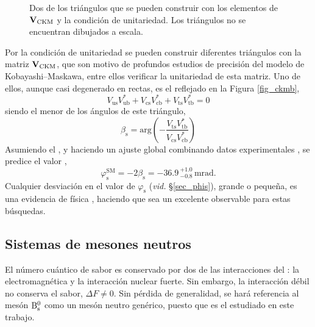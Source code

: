 \begin{figure}[H]
\centering
{} \hfill
{} \hfill
%
\caption{Dos de los triángulos que se pueden construir con los elementos de $\mathbf{V}_{\text{CKM}}$ y la condición de unitariedad. Los triángulos no se encuentran dibujados a escala.}	
\end{figure}


Por la condición de unitariedad se pueden construir diferentes triángulos con la matriz $\mathbf{V}_{\text{CKM}}$, que son motivo de profundos estudios de precisión del modelo de Kobayashi--Maskawa, entre ellos verificar la unitariedad de esta matriz. Uno de ellos, aunque casi degenerado en rectas, es el reflejado en la Figura \ref{fig_ckmb},
\begin{equation}
 V_{\mathrm{us}} V_{\mathrm{ub}}^* + V_{\mathrm{cs}} V_{\mathrm{cb}}^* + V_{\mathrm{ts}} V_{\mathrm{tb}}^* = 0 
\end{equation}
siendo el menor de los ángulos de este triángulo,
\begin{equation}
	\beta_{\mathrm{s}} =  \text{arg} \left( - \frac{V_{\mathrm{ts}} V_{\mathrm{tb}}^*}{V_{\mathrm{cs}} V_{\mathrm{cb}}^*}   \right)  \label{eq_bs_ckm}
\end{equation}
\color{vero} Asumiendo el \stdmod, y haciendo un ajuste global combinando datos experimentales \cite{ckmfitter1}, se predice el valor  , %
\begin{equation}
	\varphi_{\text{s}}^{\text{SM}} = -2 \beta_{\text{s}} = -36.9\,{}_{-0.8}^{+1.0} \, \text{mrad}. \label{eq_smpredicphis}
\end{equation} \color{norm}
\color{dieg} Cualquier desviación en el valor de $\varphi_{\text{s}}$ (\emph{vid.} \S\ref{sec_phis}), grande o pequeña, es una evidencia de física \bstdmod, haciendo que  sea un excelente observable para estas búsquedas. \color{norm}

\subsection{Sistemas de mesones neutros} %
\label{sec_neutralmesons}

El número cuántico de sabor es conservado por dos de las interacciones del \stdmod: la electromagnética y la interacción nuclear fuerte. Sin embargo, la interacción débil no conserva el sabor, $\Delta F \neq 0$. Sin pérdida de generalidad, se hará referencia al mesón $\text{B}{}_{\text{s}}^{0}$ como un mesón neutro genérico, puesto que es el \color{vero}estudiado \color{norm} en este trabajo. 

